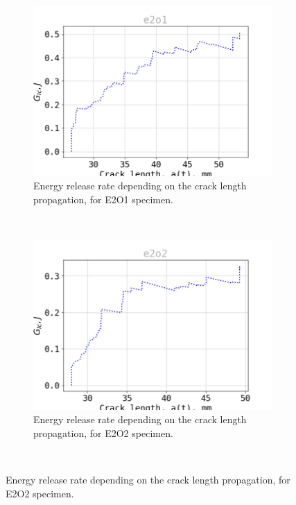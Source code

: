 \begin{figure}[H]
\centering
\begin{subfigure}{0.48\linewidth}
	\centering
	\includegraphics[scale=0.3]{Figures/e2o1_G}
	\decoRule
	\caption[Energy release rate E2O1]{Energy release rate depending on the crack length propagation, for E2O1 specimen.}
	\label{fig:E2O1_G}
\end{subfigure}
\hfill\\
\begin{subfigure}{0.48\linewidth}
	\centering
	\includegraphics[scale=0.3]{Figures/e2o2_G}
	\decoRule
	\caption[Energy release rate E2O2]{Energy release rate depending on the crack length propagation, for E2O2 specimen.}
	\label{fig:E2O2_G}
\end{subfigure}
\hfill\\

\end{figure}
